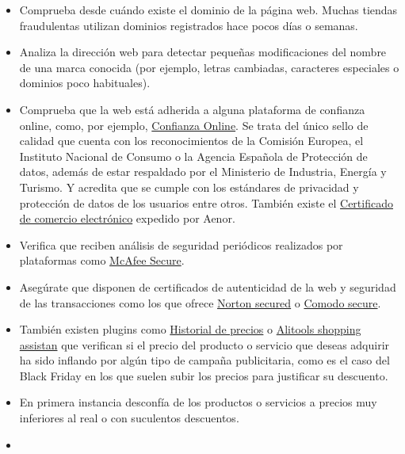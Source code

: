 \documentclass[
  spanish,
  a4paper,
  openany]{book}
\begin{document}
\begin{itemize}
  \begin{itemize}
  \item
    Comprueba desde cuándo existe el dominio de la página web. Muchas tiendas fraudulentas utilizan dominios registrados hace pocos días o semanas.
  \item
    Analiza la dirección web para detectar pequeñas modificaciones del nombre de una marca conocida (por ejemplo, letras cambiadas, caracteres especiales o dominios poco habituales).
  \item
    Comprueba que la web está adherida a alguna plataforma de confianza online, como, por ejemplo, \href{https://www.confianzaonline.es/}{Confianza Online}. Se trata del único sello de calidad que cuenta con los reconocimientos de la Comisión Europea, el Instituto Nacional de Consumo o la Agencia Española de Protección de datos, además de estar respaldado por el Ministerio de Industria, Energía y Turismo. Y acredita que se cumple con los estándares de privacidad y protección de datos de los usuarios entre otros. También existe el \href{https://www.aenor.com/certificacion/tecnologias-de-la-informacion/buenas-practicas-comercio-electronico}{Certificado de comercio electrónico} expedido por Aenor.
  \item
    Verifica que reciben análisis de seguridad periódicos realizados por plataformas como \href{https://www.mcafeesecure.com/certification}{McAfee Secure}.
  \item
    Asegúrate que disponen de certificados de autenticidad de la web y seguridad de las transacciones como los que ofrece \href{https://es.norton.com/internet-security}{Norton secured} o \href{https://www.comodo.com/home/internet-security/secure-shopping.php}{Comodo secure}.
  \item
    También existen plugins como \href{https://chrome.google.com/webstore/detail/historial-de-precios/fdeopiliemdomncemeibjpmccgmnkfig?hl=es-419&authuser=0}{Historial de precios} o \href{https://chrome.google.com/webstore/detail/alitools-shopping-assista/eenflijjbchafephdplkdmeenekabdfb?hl=es-419&authuser=0}{Alitools shopping assistan} que verifican si el precio del producto o servicio que deseas adquirir ha sido inflando por algún tipo de campaña publicitaria, como es el caso del Black Friday en los que suelen subir los precios para justificar su descuento.
  \item
    En primera instancia desconfía de los productos o servicios a precios muy inferiores al real o con suculentos descuentos.
  \item

\end{itemize}
\end{itemize}
\end{document}
